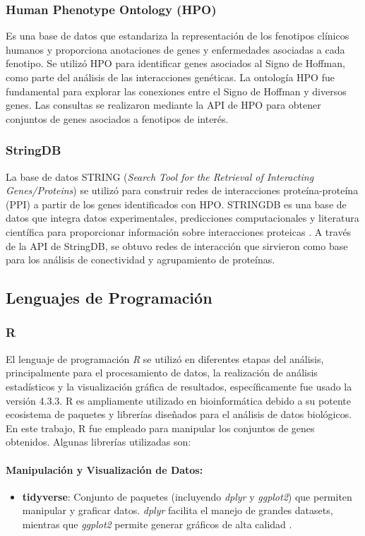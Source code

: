 \subsubsection{Human Phenotype Ontology (HPO)}
Es una base de datos que estandariza la representación de los fenotipos clínicos humanos y proporciona anotaciones de genes y enfermedades asociadas a cada fenotipo\cite{gargano2024}. Se utilizó HPO para identificar genes asociados al Signo de Hoffman, como parte del análisis de las interacciones genéticas. La ontología HPO fue fundamental para explorar las conexiones entre el Signo de Hoffman y diversos genes. Las consultas se realizaron mediante la API de HPO para obtener conjuntos de genes asociados a fenotipos de interés.

\subsubsection{StringDB}
La base de datos STRING (\textit{Search Tool for the Retrieval of Interacting Genes/Proteins}) se utilizó para construir redes de interacciones proteína-proteína (PPI) a partir de los genes identificados con HPO. STRINGDB es una base de datos que integra datos experimentales, predicciones computacionales y literatura científica para proporcionar información sobre interacciones proteicas \cite{szklarczyk2019}. A través de la API de StringDB, se obtuvo redes de interacción que sirvieron como base para los análisis de conectividad y agrupamiento de proteínas.

\subsection{Lenguajes de Programación}

\subsubsection{R}
El lenguaje de programación \textit{R} se utilizó en diferentes etapas del análisis, principalmente para el procesamiento de datos, la realización de análisis estadísticos y la visualización gráfica de resultados, específicamente fue usado la versión 4.3.3. R es ampliamente utilizado en bioinformática debido a su potente ecosistema de paquetes y librerías diseñados para el análisis de datos biológicos\cite{chan2018}. En este trabajo, R fue empleado para manipular los conjuntos de genes obtenidos. Algunas librerías utilizadas son:


\paragraph{Manipulación y Visualización de Datos:}
\begin{itemize}
	\item \textbf{tidyverse}: Conjunto de paquetes (incluyendo \textit{dplyr} y \textit{ggplot2}) que permiten manipular y graficar datos. \textit{dplyr} facilita el manejo de grandes datasets, mientras que \textit{ggplot2} permite generar gráficos de alta calidad \cite{Wickham2019}.
\end{itemize}

